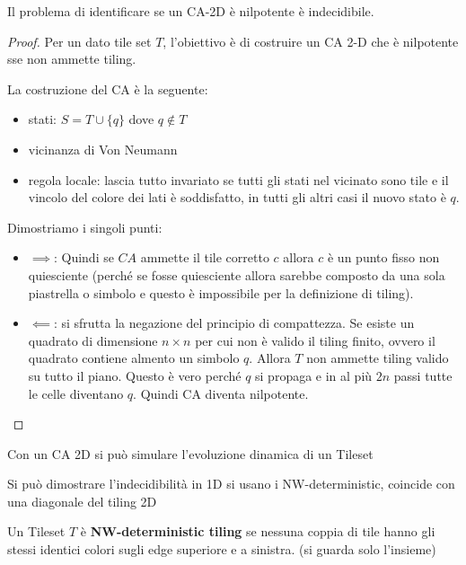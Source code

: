 \begin{teorema} 
    Il problema di identificare se un CA-2D è nilpotente è indecidibile. 
    \begin{proof}
        Per un dato tile set $T$, l'obiettivo è di costruire un CA 2-D che è
        nilpotente sse non ammette tiling.

        La costruzione del CA è la seguente:
        \begin{itemize}
            \item stati: $S=T\cup \{q\}$ dove $q\not\in T$
            \item vicinanza di Von Neumann
            \item regola locale: lascia tutto invariato se tutti gli stati nel 
            vicinato sono tile e il vincolo del colore dei lati è soddisfatto, in 
            tutti gli altri casi il nuovo stato è $q$.
        \end{itemize}
        Dimostriamo i singoli punti:
        \begin{itemize}
            \item $\implies$:
            Quindi se $CA$ ammette il tile corretto $c$ allora $c$ è un punto fisso 
            non quiesciente (perché se fosse quiesciente allora sarebbe composto 
            da una sola piastrella o simbolo e questo è impossibile per la definizione 
            di tiling). 
            \item $\impliedby$: si sfrutta la negazione del principio di compattezza.
            Se esiste un quadrato di dimensione $n\times n$ per cui non è valido 
            il tiling finito, ovvero il quadrato contiene almento un simbolo $q$.
            Allora $T$ non ammette tiling valido su tutto il piano. Questo è vero
            perché $q$ si propaga e in al più $2n$ passi tutte le celle diventano 
            $q$. Quindi CA diventa nilpotente.
        \end{itemize}
    \end{proof}
\end{teorema}

\begin{nota}
    Con un CA 2D si può simulare l'evoluzione dinamica di un Tileset
\end{nota}

Si può dimostrare l'indecidibilità in 1D si usano i NW-deterministic, coincide 
con una diagonale del tiling 2D  

\begin{definizione} 
    Un Tileset $T$ è \textbf{NW-deterministic tiling} se nessuna coppia di tile
    hanno gli stessi identici colori sugli edge superiore e a sinistra. (si guarda solo l'insieme)
\end{definizione}

